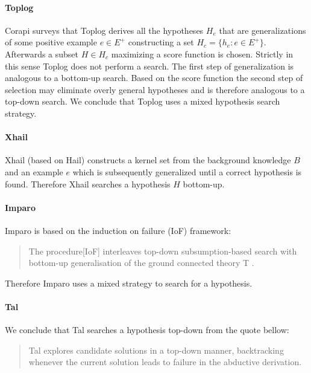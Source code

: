 \paragraph{Toplog\cite{muggleton2008toplog}}
Corapi \cite{corapi2011nonmonotonic} surveys that Toplog derives all the hypotheses $H_e$ that are generalizations of some positive example $e \in E^+$ constructing a set $H_c=\{h_e:e \in E^+\}$.
Afterwards a subset $H \in H_c$ maximizing a score function is chosen. Strictly in this sense Toplog does not perform a search. The first step of generalization is analogous to a bottom-up search. Based on the score function the second step of selection may eliminate overly general hypotheses and is therefore analogous to a top-down search. We conclude that Toplog uses a mixed hypothesis search strategy.
\paragraph{Xhail\cite{ray2003hybrid}}
Xhail (based on Hail) constructs a kernel set from the background knowledge $B$ and an example $e$ which is subsequently generalized until a correct hypothesis is found. Therefore Xhail searches a hypothesis $H$ bottom-up.

\paragraph{Imparo}
Imparo is based on the induction on failure (IoF) framework:
\begin{quote}\cite{kimber2012learning}
The procedure[IoF] interleaves top-down subsumption-based search with bottom-up generalisation of the ground connected theory T .
\end{quote}
Therefore Imparo uses a mixed strategy to search for a hypothesis.
\paragraph{Tal}
We conclude that Tal searches a hypothesis top-down from the quote bellow:
\begin{quote}\cite{corapi2010inductive}
Tal explores candidate solutions in a top-down manner,
backtracking whenever the current solution leads to failure in the abductive derivation.
\end{quote}
